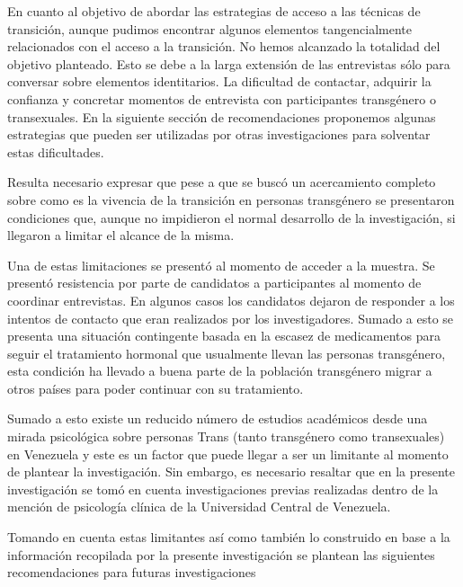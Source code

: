 En cuanto al objetivo de abordar las estrategias de acceso a las técnicas de
transición, aunque pudimos encontrar algunos elementos tangencialmente
relacionados con el acceso a la transición. No hemos alcanzado la totalidad del
objetivo planteado. Esto se debe a la larga extensión de las entrevistas sólo
para conversar sobre elementos identitarios. La dificultad de contactar,
adquirir la confianza y concretar momentos de entrevista con participantes
transgénero o transexuales. En la siguiente sección de recomendaciones
proponemos algunas estrategias que pueden ser utilizadas por otras
investigaciones para solventar estas dificultades.

Resulta necesario expresar que pese a que se buscó un acercamiento completo
sobre como es la vivencia de la transición en personas transgénero se
presentaron condiciones que, aunque no impidieron el normal desarrollo de la
investigación, si llegaron a limitar el alcance de la misma.

Una de estas limitaciones se presentó al momento de acceder a la muestra. Se
presentó resistencia por parte de candidatos a participantes al momento de
coordinar entrevistas. En algunos casos los candidatos dejaron de responder a
los intentos de contacto que eran realizados por los investigadores. Sumado a
esto se presenta una situación contingente basada en la escasez de medicamentos
para seguir el tratamiento hormonal que usualmente llevan las personas
transgénero, esta condición ha llevado a buena parte de la población transgénero
migrar a otros países para poder continuar con su tratamiento.

Sumado a esto existe un reducido número de estudios académicos desde una mirada
psicológica sobre personas Trans (tanto transgénero como transexuales) en
Venezuela y este es un factor que puede llegar a ser un limitante al momento de
plantear la investigación. Sin embargo, es necesario resaltar que en la presente
investigación se tomó en cuenta investigaciones previas realizadas dentro de
la mención de psicología clínica de la Universidad Central de Venezuela.

Tomando en cuenta estas limitantes así como también lo construido en base a la
información recopilada por la presente investigación se plantean las siguientes
recomendaciones para futuras investigaciones

